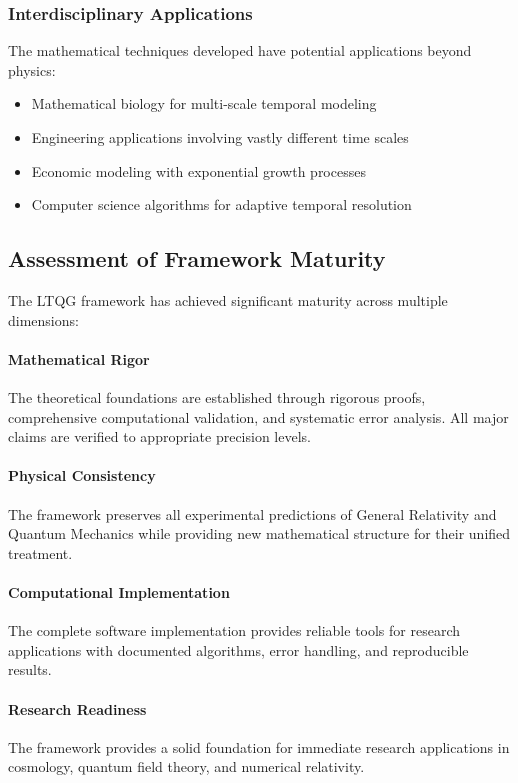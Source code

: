 \subsubsection{Interdisciplinary Applications}

The mathematical techniques developed have potential applications beyond physics:
\begin{itemize}
\item Mathematical biology for multi-scale temporal modeling
\item Engineering applications involving vastly different time scales
\item Economic modeling with exponential growth processes
\item Computer science algorithms for adaptive temporal resolution
\end{itemize}

\subsection{Assessment of Framework Maturity}
\label{subsec:framework_maturity}

The LTQG framework has achieved significant maturity across multiple dimensions:

\paragraph{Mathematical Rigor} The theoretical foundations are established through rigorous proofs, comprehensive computational validation, and systematic error analysis. All major claims are verified to appropriate precision levels.

\paragraph{Physical Consistency} The framework preserves all experimental predictions of General Relativity and Quantum Mechanics while providing new mathematical structure for their unified treatment.

\paragraph{Computational Implementation} The complete software implementation provides reliable tools for research applications with documented algorithms, error handling, and reproducible results.

\paragraph{Research Readiness} The framework provides a solid foundation for immediate research applications in cosmology, quantum field theory, and numerical relativity.

